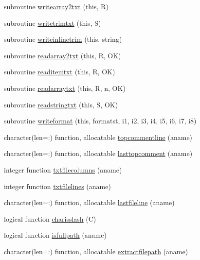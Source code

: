 \begin{DoxyCompactItemize}
\item 
subroutine \mbox{\hyperlink{namespacefileutils_a35a5634d3290863e76dddffcf9ac63e2}{writearray2txt}} (this, R)
\item 
subroutine \mbox{\hyperlink{namespacefileutils_a1b72d4facdf945b9ab5d8cf747100c96}{writetrimtxt}} (this, S)
\item 
subroutine \mbox{\hyperlink{namespacefileutils_a01a3ab096e4a99267bda3254c773e55b}{writeinlinetrim}} (this, string)
\item 
subroutine \mbox{\hyperlink{namespacefileutils_a1917cefee39a500fd5987b5165c97d8a}{readarray2txt}} (this, R, OK)
\item 
subroutine \mbox{\hyperlink{namespacefileutils_a66242f0b2d2b3f96d182f76f5e616c7d}{readitemtxt}} (this, R, OK)
\item 
subroutine \mbox{\hyperlink{namespacefileutils_a580904418c96464193ec145fd077c14b}{readarraytxt}} (this, R, n, OK)
\item 
subroutine \mbox{\hyperlink{namespacefileutils_ade8cd999a137d0402f901977ef1441c0}{readstringtxt}} (this, S, OK)
\item 
subroutine \mbox{\hyperlink{namespacefileutils_a0c8c6f2ca823e9e6d8a31d4002347730}{writeformat}} (this, formatst, i1, i2, i3, i4, i5, i6, i7, i8)
\item 
character(len=\+:) function, allocatable \mbox{\hyperlink{namespacefileutils_ae11b16645a03a608941045fd5b9d2d8a}{topcommentline}} (aname)
\item 
character(len=\+:) function, allocatable \mbox{\hyperlink{namespacefileutils_ae232e4522b4ac06686734f7d1d457d21}{lasttopcomment}} (aname)
\item 
integer function \mbox{\hyperlink{namespacefileutils_aef4950c08afd7c3cd6edffdb879a81f3}{txtfilecolumns}} (aname)
\item 
integer function \mbox{\hyperlink{namespacefileutils_a2b9938e7b58f8d85091546603d9e8f08}{txtfilelines}} (aname)
\item 
character(len=\+:) function, allocatable \mbox{\hyperlink{namespacefileutils_ae3e1c820dd72fbdae478ed44d5cd065c}{lastfileline}} (aname)
\item 
logical function \mbox{\hyperlink{namespacefileutils_a325f66a61f2de7872003adf25ec2bfbd}{charisslash}} (C)
\item 
logical function \mbox{\hyperlink{namespacefileutils_a89b6c0a1ef1dc72e17a37f50a71a98ed}{isfullpath}} (aname)
\item 
character(len=\+:) function, allocatable \mbox{\hyperlink{namespacefileutils_a5debf7f081524e507253598ba943ad1a}{extractfilepath}} (aname)

\end{DoxyCompactItemize}
